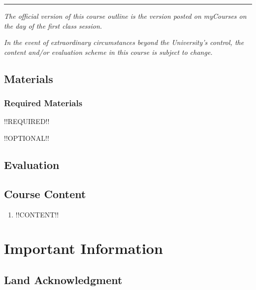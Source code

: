\documentclass{article}
\begin{document}
\vfill

\hrule
 
{\em The official version of this course outline is the version posted
  on myCourses on the day of the first class session.}

{\em In the event of extraordinary circumstances beyond the
  University's control, the content and/or evaluation scheme in this
  course is subject to change.}


\newpage

\subsection{Materials}

\subsubsection{Required Materials}

!!REQUIRED!!

!!OPTIONAL!!

\newpage

\subsection{Evaluation}
\label{eval}

\begin{center}
\end{center}

\newpage

\subsection{Course Content}

\begin{enumerate}
\item{!!CONTENT!!}
\end{enumerate}

\newpage

\section{Important Information}

\subsection{Land Acknowledgment}
\end{document}
